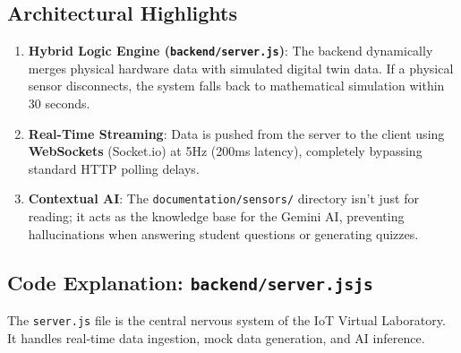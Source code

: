 \documentclass[12pt,a4paper]{article}
\newcommand{\keyword}[1]{\textcolor{keywordcolor}{\textbf{#1}}}
\newcommand{\Q}[1]{\textcolor{questioncolor}{\textbf{#1}}}
\newcommand{\codeinline}[1]{\texttt{\small #1}}
\begin{document}
\vspace{0.5cm}

\subsection*{Architectural Highlights}

\begin{tcolorbox}[keybox, title=\faStar\; Three Pillars of the System]
\begin{enumerate}
    \item \Q{Hybrid Logic Engine (\codeinline{backend/server.js})}: The backend dynamically merges physical hardware data with simulated digital twin data. If a physical sensor disconnects, the system falls back to mathematical simulation within 30 seconds.
    \item \Q{Real-Time Streaming}: Data is pushed from the server to the client using \keyword{WebSockets} (Socket.io) at 5Hz (200ms latency), completely bypassing standard HTTP polling delays.
    \item \Q{Contextual AI}: The \codeinline{documentation/sensors/} directory isn't just for reading; it acts as the knowledge base for the Gemini AI, preventing hallucinations when answering student questions or generating quizzes.
\end{enumerate}
\end{tcolorbox}

\vspace{0.5cm}

\subsection*{Code Explanation: \codeinline{backend/server.jsjs}}

The \texttt{server.js} file is the central nervous system of the IoT Virtual Laboratory. It handles real-time data ingestion, mock data generation, and AI inference.
\end{document}
